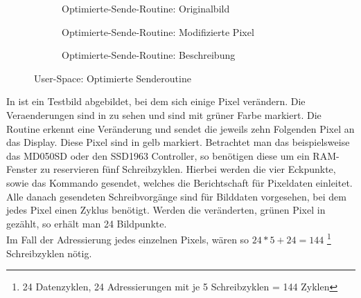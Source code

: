 \begin{figure}[htp]
        \begin{center}
        \begin{subfigure}[htp]{0.8\textwidth}
			\centering
			\caption{Optimierte-Sende-Routine: Originalbild}
			\label{fig:optimierte_routine_original}
		\end{subfigure}


        \begin{subfigure}[htp]{0.8\textwidth}
	\centering
{}
	\caption{Optimierte-Sende-Routine: Modifizierte Pixel}
	\label{fig:optimierte_routine_mod}
\end{subfigure}


        \begin{subfigure}[htp]{0.8\textwidth}
	\centering
{}
	\caption{Optimierte-Sende-Routine: Beschreibung}
	\label{fig:optimierte_routine_desc}
\end{subfigure}
		\end{center}
\caption{User-Space: Optimierte Senderoutine}
\end{figure}
In  ist ein Testbild abgebildet, bei dem sich einige Pixel verändern. Die Veraenderungen sind in  zu sehen und sind mit grüner Farbe markiert. Die Routine erkennt eine Veränderung und sendet die jeweils zehn Folgenden Pixel an das Display. Diese Pixel sind in  gelb markiert. 
Betrachtet man das beispielsweise das MD050SD oder den SSD1963 Controller, so benötigen diese um ein RAM-Fenster zu reservieren fünf Schreibzyklen. Hierbei werden die vier Eckpunkte, sowie das Kommando gesendet, welches die Berichtschaft für Pixeldaten einleitet. Alle danach gesendeten Schreibvorgänge sind für Bilddaten vorgesehen, bei dem jedes Pixel einen Zyklus benötigt. Werden die veränderten, grünen Pixel in  gezählt, so erhält man 24 Bildpunkte.\\
Im Fall der Adressierung jedes einzelnen Pixels, wären so $24 * 5 + 24 = 144$ \footnote{24 Datenzyklen, 24 Adressierungen mit je 5 Schreibzyklen = 144 Zyklen} Schreibzyklen nötig. \\
